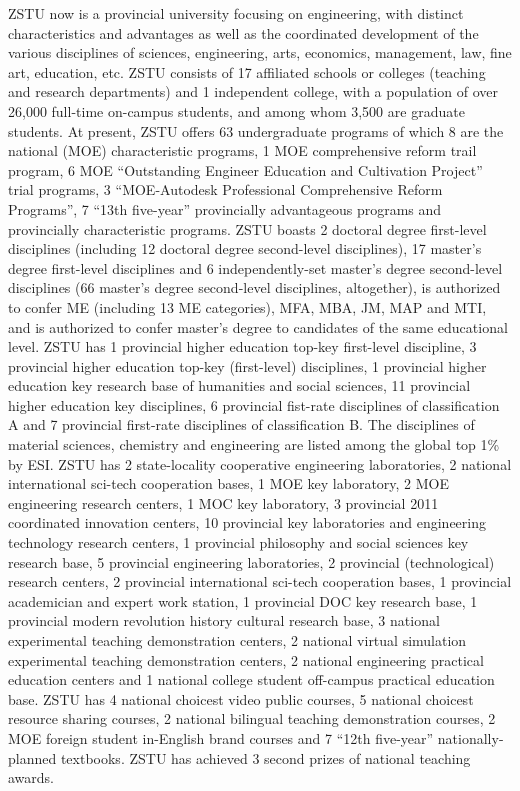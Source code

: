 \begin{englishabstract}
ZSTU now is a provincial university focusing on engineering, with distinct characteristics and advantages as well as the coordinated development of the various disciplines of sciences, engineering, arts, economics, management, law, fine art, education, etc. ZSTU consists of 17 affiliated schools or colleges (teaching and research departments) and 1 independent college, with a population of over 26,000 full-time on-campus students, and among whom 3,500 are graduate students. At present, ZSTU offers 63 undergraduate programs of which 8 are the national (MOE) characteristic programs, 1 MOE comprehensive reform trail program, 6 MOE “Outstanding Engineer Education and Cultivation Project” trial programs, 3 “MOE-Autodesk Professional Comprehensive Reform Programs”, 7 “13th five-year” provincially advantageous programs and provincially characteristic programs. ZSTU boasts 2 doctoral degree first-level disciplines (including 12 doctoral degree second-level disciplines), 17 master’s degree first-level disciplines and 6 independently-set master’s degree second-level disciplines (66 master’s degree second-level disciplines, altogether), is authorized to confer ME (including 13 ME categories), MFA, MBA, JM, MAP and MTI, and is authorized to confer master’s degree to candidates of the same educational level. ZSTU has 1 provincial higher education top-key first-level discipline, 3 provincial higher education top-key (first-level) disciplines, 1 provincial higher education key research base of humanities and social sciences, 11 provincial higher education key disciplines, 6 provincial fist-rate disciplines of classification A and 7 provincial first-rate disciplines of classification B. The disciplines of material sciences, chemistry and engineering are listed among the global top 1\% by ESI. ZSTU has 2 state-locality cooperative engineering laboratories, 2 national international sci-tech cooperation bases, 1 MOE key laboratory, 2 MOE engineering research centers, 1 MOC key laboratory, 3 provincial 2011 coordinated innovation centers, 10 provincial key laboratories and engineering technology research centers, 1 provincial philosophy and social sciences key research base, 5 provincial engineering laboratories, 2 provincial (technological) research centers, 2 provincial international sci-tech cooperation bases, 1 provincial academician and expert work station, 1 provincial DOC key research base, 1 provincial modern revolution history cultural research base, 3 national experimental teaching demonstration centers, 2 national virtual simulation experimental teaching demonstration centers, 2 national engineering practical education centers and 1 national college student off-campus practical education base. ZSTU has 4 national choicest video public courses, 5 national choicest resource sharing courses, 2 national bilingual teaching demonstration courses, 2 MOE foreign student in-English brand courses and 7 “12th five-year” nationally-planned textbooks. ZSTU has achieved 3 second prizes of national teaching awards.


\end{englishabstract}
